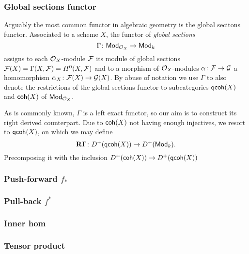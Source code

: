 \subsubsection{Global sections functor}
Arguably the most common functor in algebraic geometry is the global secitons functor. Associated to a scheme $X$, the functor of \emph{global sections}
\[
    \Gamma \colon \mathsf{Mod}_{\mathcal O_X} \to \mathsf{Mod}_{k}
\]
assigns to each $\mathcal O_X$-module $\mathcal F$ its module of global sections $\mathcal F(X) = \Gamma(X, \mathcal F) = H^0(X, \mathcal F)$ and to a morphism of $\mathcal O_X$-modules $\alpha\colon \mathcal F \to \mathcal G$ a homomorphism $\alpha_X \colon \mathcal F(X) \to \mathcal G(X)$.
By abuse of notation we use $\Gamma$ to also denote the restrictions of the global sections functor to subcategories $\mathsf{qcoh}(X)$ and $\mathsf{coh}(X)$ of $\mathsf{Mod}_{\mathcal O_X}$.

As is commonly known, $\Gamma$ is a left exact functor, so our aim is to construct its right derived counterpart. Due to $\mathsf{coh}(X)$ not having enough injectives, we resort to $\mathsf{qcoh}(X)$, on which we may define 
\[
    \mathbf{R}^{}\Gamma\colon D^+(\mathsf{qcoh}(X)) \to D^+(\mathsf{Mod}_{k}).
\]
Precomposing it with the inclusion $D^+(\mathsf{coh}(X)) \to D^+(\mathsf{qcoh}(X))$







\subsubsection{Push-forward $f_*$}
\subsubsection{Pull-back $f^*$}
\subsubsection{Inner hom}
\subsubsection{Tensor product }
